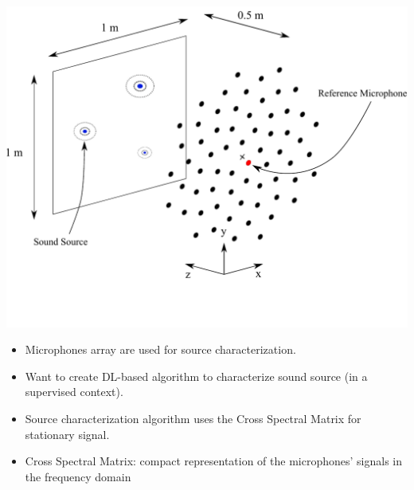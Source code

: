 \documentclass[12pt,pdftex,16x10]{elpres} %
\begin{document}
\begin{psli}
  \begin{minipage}[b][0.7\textheight][t]{0.5\textwidth}
    \centering
    \includegraphics[width=1.1\textwidth]{figs/full_measurement_setup.pdf}
  \end{minipage}
  \begin{minipage}[b][0.7\textheight][t]{0.5\textwidth}
    \begin{itemize}
      \item Microphones array are used for source characterization.
      \item Want to create DL-based algorithm to characterize sound source (in a supervised context).
      \item Source characterization algorithm uses the Cross Spectral Matrix for stationary signal.
      \item Cross Spectral Matrix: compact representation of the microphones' signals in the frequency domain
    \end{itemize}
  \end{minipage}
\end{psli}
\end{document}
